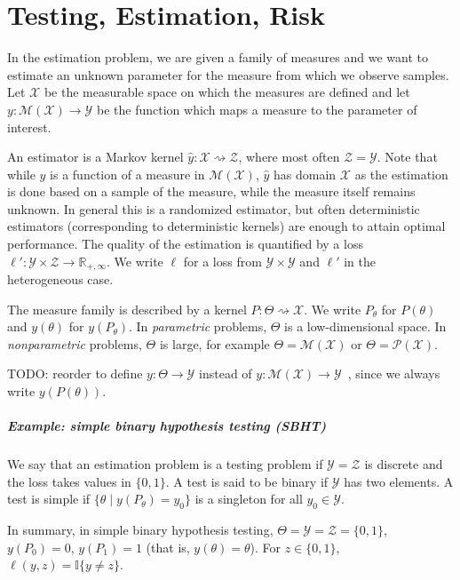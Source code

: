 \chapter{Testing, Estimation, Risk}

In the estimation problem, we are given a family of measures and we want to estimate an unknown parameter for the measure from which we observe samples.
Let $\mathcal X$ be the measurable space on which the measures are defined and let $y : \mathcal M(\mathcal X) \to \mathcal Y$ be the function which maps a measure to the parameter of interest.

An estimator is a Markov kernel $\hat{y} : \mathcal X \rightsquigarrow \mathcal Z$, where most often $\mathcal Z = \mathcal Y$.
Note that while $y$ is a function of a measure in $\mathcal M(\mathcal X)$, $\hat{y}$ has domain $\mathcal X$ as the estimation is done based on a sample of the measure, while the measure itself remains unknown.
In general this is a randomized estimator, but often deterministic estimators (corresponding to deterministic kernels) are enough to attain optimal performance.
The quality of the estimation is quantified by a loss $\ell' : \mathcal Y \times \mathcal Z \to \mathbb{R}_{+, \infty}$. We write $\ell$ for a loss from $\mathcal Y \times \mathcal Y$ and $\ell'$ in the heterogeneous case.

The measure family is described by a kernel $P : \Theta \rightsquigarrow \mathcal X$. We write $P_\theta$ for $P(\theta)$ and $y(\theta)$ for $y(P_\theta)$.
In \emph{parametric} problems, $\Theta$ is a low-dimensional space. In \emph{nonparametric} problems, $\Theta$ is large, for example $\Theta = \mathcal M (\mathcal X)$ or $\Theta = \mathcal P(\mathcal X)$.

TODO: reorder to define $y: \Theta \to \mathcal Y$ instead of $y : \mathcal M(\mathcal X) \to \mathcal Y$~, since we always write $y(P(\theta))$.

\paragraph{Example: simple binary hypothesis testing (SBHT)}

We say that an estimation problem is a testing problem if $\mathcal Y = \mathcal Z$ is discrete and the loss takes values in $\{0, 1\}$.
A test is said to be binary if $\mathcal Y$ has two elements.
A test is simple if $\{\theta \mid y(P_\theta) = y_0\}$ is a singleton for all $y_0 \in \mathcal Y$.

In summary, in simple binary hypothesis testing, $\Theta = \mathcal Y = \mathcal Z = \{0,1\}$, $y(P_0) = 0$, $y(P_1) = 1$ (that is, $y(\theta) = \theta$). For $z \in \{0,1\}$, $\ell(y, z) = \mathbb{I}\{y \ne z\}$.

